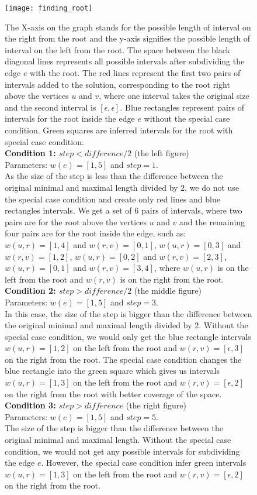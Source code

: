 \begin{figure}[!htbp]
	\centering
  	\texttt{[image: finding\_root]}
  	\caption[Rooting the gene tree]
  	{The X-axis on the graph stands for the possible length of interval on the right from the root and the y-axis signifies the possible length of interval on the left from the root. The space between the black diagonal lines represents all possible intervals after subdividing the edge $e$ with the root. The red lines represent the first two pairs of intervals added to the solution, corresponding to the root right above the vertices $u$ and $v$, where one interval takes the original size and the second interval is $[\epsilon, \epsilon]$. Blue rectangles represent  pairs of intervals for the root inside the edge $e$ without the special case condition. Green squares are inferred intervals for the root with special case condition. \\
\textbf{Condition 1: $step < difference / 2$} (the left figure)\\
  	Parameters: $w(e) = [1, 5]$ and $step = 1$. \\
  	As the size of the step is less than the difference between the original minimal and maximal length divided by $2$, we do not use the special case condition and create only red lines and blue rectangles intervals. We get a set of 6 pairs of intervals, where two pairs are for the root above the vertices $u$ and $v$ and the remaining four pairs are for the root inside the edge, such as: $w(u, r) = [1, 4]$ and $w(r, v) = [0, 1]$, $w(u, r) = [0, 3]$ and $w(r, v) = [1, 2]$, $w(u, r) = [0, 2]$ and $w(r, v) = [2, 3]$, $w(u, r) = [0, 1]$ and $w(r, v) = [3, 4]$, where $w(u, r)$ is on the left from the root and $w(r, v)$ is on the right from the root.\\  	
  	\textbf{Condition 2: $step > difference / 2$} (the middle figure)\\
  	Parameters: $w(e) = [1, 5]$ and $step = 3$. \\
  	In this case, the size of the step is bigger than the difference between the original minimal and maximal length divided by $2$. Without the special case condition, we would only get the blue rectangle intervals $w(u,r)=[1,2]$ on the left from the root and $w(r,v)=[\epsilon, 3]$ on the right from the root. The special case condition changes the blue rectangle into the green square which gives us intervals $w(u, r) = [1, 3]$ on the left from the root and $w(r, v) = [\epsilon, 2]$ on the right from the root with better coverage of the space.\\
  	\textbf{Condition 3: $step > difference$} (the right figure)\\
  	Parameters: $w(e) = [1, 5]$ and $step = 5$. \\
  	The size of the step is bigger than the difference between the original minimal and maximal length. Without the special case condition, we would not get any possible intervals for subdividing the edge $e$. However, the special case condition infer green intervals $w(u, r) = [1, 3]$ on the left from the root and $w(r, v) = [\epsilon, 2]$ on the right from the root.}
  	\label{finding_root}
\end{figure}

